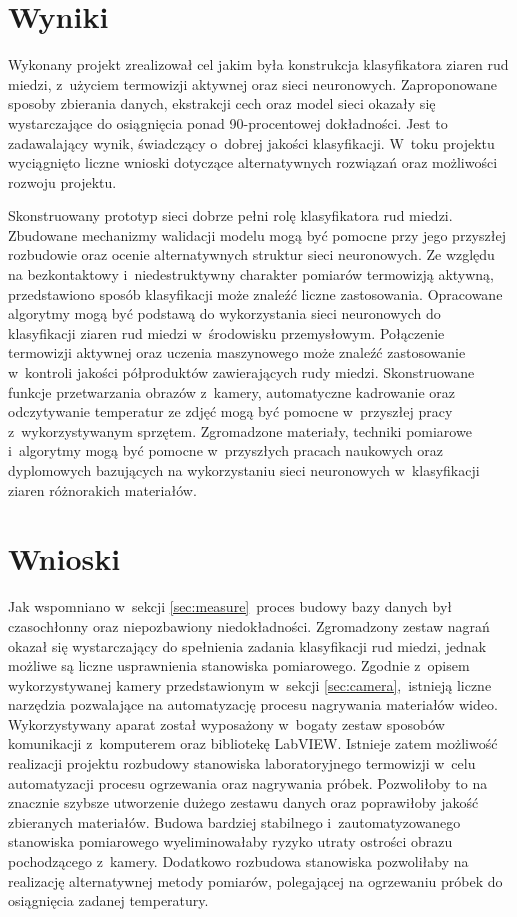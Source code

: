 \section{Wyniki}
Wykonany projekt zrealizował cel jakim była konstrukcja klasyfikatora ziaren rud
miedzi, z~użyciem termowizji aktywnej oraz sieci neuronowych.
Zaproponowane sposoby zbierania danych, ekstrakcji cech oraz model sieci okazały
się wystarczające do osiągnięcia ponad 90-procentowej
dokładności.
Jest to zadawalający wynik, świadczący o~dobrej jakości klasyfikacji.
W~toku projektu wyciągnięto liczne wnioski dotyczące alternatywnych rozwiązań
oraz możliwości rozwoju projektu.

Skonstruowany prototyp sieci dobrze pełni rolę klasyfikatora rud miedzi.
Zbudowane mechanizmy walidacji modelu mogą być pomocne przy jego przyszłej
rozbudowie oraz ocenie alternatywnych struktur sieci neuronowych.
Ze względu na bezkontaktowy i~niedestruktywny charakter pomiarów termowizją
aktywną, przedstawiono sposób klasyfikacji może znaleźć liczne zastosowania.
Opracowane algorytmy mogą być podstawą do wykorzystania sieci neuronowych do
klasyfikacji ziaren rud miedzi w~środowisku przemysłowym.
Połączenie termowizji aktywnej oraz uczenia maszynowego może znaleźć
zastosowanie w~kontroli jakości półproduktów zawierających rudy miedzi.
Skonstruowane funkcje przetwarzania obrazów z~kamery, automatyczne kadrowanie
oraz odczytywanie temperatur ze zdjęć mogą być pomocne w~przyszłej pracy
z~wykorzystywanym sprzętem.
Zgromadzone materiały, techniki pomiarowe i~algorytmy mogą być pomocne
w~przyszłych pracach naukowych oraz dyplomowych bazujących na wykorzystaniu
sieci neuronowych w~klasyfikacji ziaren różnorakich materiałów.

\section{Wnioski}
Jak wspomniano w~sekcji \ref{sec:measure}~proces budowy bazy danych był
czasochłonny oraz niepozbawiony niedokładności.
Zgromadzony zestaw nagrań okazał się wystarczający do spełnienia zadania
klasyfikacji rud miedzi, jednak możliwe są liczne usprawnienia stanowiska
pomiarowego.
Zgodnie z~opisem wykorzystywanej kamery przedstawionym w~sekcji
\ref{sec:camera},~istnieją liczne narzędzia pozwalające na automatyzację
procesu nagrywania materiałów wideo.
Wykorzystywany aparat został wyposażony w~bogaty zestaw sposobów komunikacji
z~komputerem oraz bibliotekę LabVIEW.
Istnieje zatem możliwość realizacji projektu rozbudowy stanowiska
laboratoryjnego termowizji w~celu automatyzacji procesu ogrzewania oraz
nagrywania próbek.
Pozwoliłoby to na znacznie szybsze utworzenie dużego zestawu danych oraz
poprawiłoby jakość zbieranych materiałów.
Budowa bardziej stabilnego i~zautomatyzowanego stanowiska pomiarowego
wyeliminowałaby ryzyko utraty ostrości obrazu pochodzącego z~kamery.
Dodatkowo rozbudowa stanowiska pozwoliłaby na realizację alternatywnej
metody pomiarów, polegającej na ogrzewaniu próbek do osiągnięcia zadanej
temperatury.

